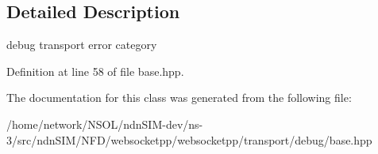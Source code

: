 \subsection{Detailed Description}
debug transport error category 

Definition at line 58 of file base.\+hpp.



The documentation for this class was generated from the following file\+:\begin{DoxyCompactItemize}
\item 
/home/network/\+N\+S\+O\+L/ndn\+S\+I\+M-\/dev/ns-\/3/src/ndn\+S\+I\+M/\+N\+F\+D/websocketpp/websocketpp/transport/debug/base.\+hpp\end{DoxyCompactItemize}
